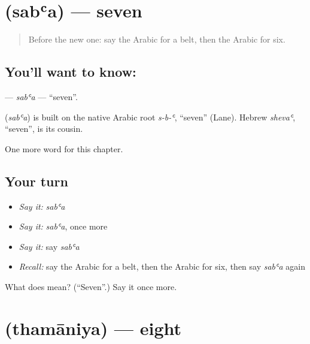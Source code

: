 \section[\texorpdfstring{\ar{سبعة} (sabʿa)}{سبعة (sabʿa)}]{ (sabʿa) — seven}

\label{lesson:AR-C96-saba}



\begin{quote}
Before the new one: say the Arabic for a belt, then the Arabic for six.
\end{quote}

\subsection*{You'll want to know: }
\textbf{} — \emph{sabʿa} — \textquotedblleft{}seven\textquotedblright{}.

\begin{cousinweb}
\textbf{} (\emph{sabʿa}) is built on the native Arabic root \emph{s-b-ʿ}, \textquotedblleft{}seven\textquotedblright{} (Lane). Hebrew \emph{shevaʿ}, \textquotedblleft{}seven\textquotedblright{}, is its cousin.
\end{cousinweb}

\begin{grammarlens}[title={What you've built}]
One more word for this chapter.
\end{grammarlens}

\subsection*{Your turn}
\begin{itemize}
\raggedright
  \item \emph{Say it:} \emph{sabʿa}
  \item \emph{Say it:} \emph{sabʿa}, once more
  \item \emph{Say it:} say \emph{sabʿa}
  \item \emph{Recall:} say the Arabic for a belt, then the Arabic for six, then say \emph{sabʿa} again
\end{itemize}

\begin{tcolorbox}[breakable,colback=teal!4,colframe=teal!35!black,title={Before you move on}]
What does  mean? (\textquotedblleft{}Seven\textquotedblright{}.) Say it once more.
\end{tcolorbox}
\section[\texorpdfstring{\ar{ثمانية} (thamāniya)}{ثمانية (thamāniya)}]{ (thamāniya) — eight}

